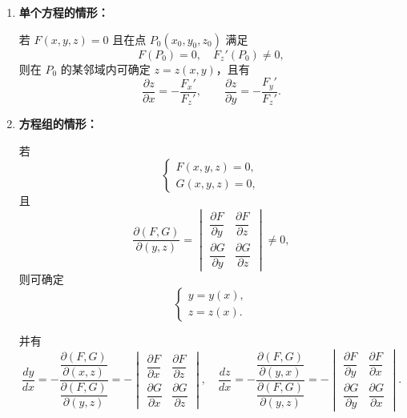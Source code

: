 \begin{enumerate}
    \item \textbf{单个方程的情形：}

          若 $F(x, y, z) = 0$ 且在点 $P_0(x_0, y_0, z_0)$ 满足
          \[
              F(P_0) = 0, \quad F_z'(P_0) \neq 0,
          \]
          则在 $P_0$ 的某邻域内可确定 $z = z(x, y)$，且有
          \[
              \frac{\partial z}{\partial x} = -\frac{F_x'}{F_z'}, \qquad
              \frac{\partial z}{\partial y} = -\frac{F_y'}{F_z'}.
          \]

    \item \textbf{方程组的情形：}

          若
          \[
              \begin{cases}
                  F(x,y,z) = 0, \\
                  G(x,y,z) = 0,
              \end{cases}
          \]
          且
          \[
              \frac{\partial(F,G)}{\partial(y,z)} =
              \begin{vmatrix}
                  \dfrac{\partial F}{\partial y} & \dfrac{\partial F}{\partial z} \\[4pt]
                  \dfrac{\partial G}{\partial y} & \dfrac{\partial G}{\partial z}
              \end{vmatrix}
              \neq 0,
          \]
          则可确定
          \[
              \begin{cases}
                  y = y(x), \\
                  z = z(x).
              \end{cases}
          \]

          并有
          \[
              \frac{dy}{dx} =
              -\frac{\dfrac{\partial(F,G)}{\partial(x,z)}}{\dfrac{\partial(F,G)}{\partial(y,z)}}
              = -\begin{vmatrix}
                  \dfrac{\partial F}{\partial x} & \dfrac{\partial F}{\partial z} \\[4pt]
                  \dfrac{\partial G}{\partial x} & \dfrac{\partial G}{\partial z}
              \end{vmatrix},
              \quad
              \frac{dz}{dx} =
              -\frac{\dfrac{\partial(F,G)}{\partial(y,x)}}{\dfrac{\partial(F,G)}{\partial(y,z)}}
              = -\begin{vmatrix}
                  \dfrac{\partial F}{\partial y} & \dfrac{\partial F}{\partial x} \\[4pt]
                  \dfrac{\partial G}{\partial y} & \dfrac{\partial G}{\partial x}
              \end{vmatrix}.
          \]
\end{enumerate}

